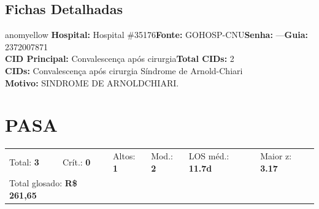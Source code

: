 \documentclass[a4paper,10pt]{article}
\begin{document}
\subsection{Fichas Detalhadas}
\begin{anomalycard}[Interna\c{c}\~{a}o \#261774 | Pac. \#192055 | MODERADO (z=2.58) | LOS: 3d | 23/02/2026\,$\to$\,26/02/2026]{anomyellow}
\textbf{Hospital:} Hospital \#35176\quad \textbf{Fonte:} GOHOSP-CNU\quad \textbf{Senha:} ---\quad \textbf{Guia:} 2372007871\\

\textbf{CID Principal:} {\small Convalescença após cirurgia}\quad\textbf{Total CIDs:} 2\\

\textbf{CIDs:} {\scriptsize Convalescença após cirurgia \textbar{} Síndrome de Arnold-Chiari}\\

\textbf{Motivo:} {\scriptsize SINDROME DE ARNOLDCHIARI.}\\



\end{anomalycard}


\clearpage
\section{PASA}
\begin{tcolorbox}[colback=lightblue,colframe=jcubeblue,title={\textbf{Resumo --- PASA}}]
\begin{tabular}{ll@{\quad}ll@{\quad}ll}
Total: \textbf{3} &
Cr\'{i}t.: \textcolor{anomred}{\textbf{0}} &
Altos: \textcolor{anomorange}{\textbf{1}} &
Mod.: \textcolor{anomyellow}{\textbf{2}} &
LOS m\'{e}d.: \textbf{11.7d} &
Maior z: \textbf{3.17} \\

\multicolumn{2}{l}{\textcolor{anomred}{Total glosado: \textbf{R\$ 261,65}}} & & \\

\end{tabular}
\end{tcolorbox}
\end{document}
